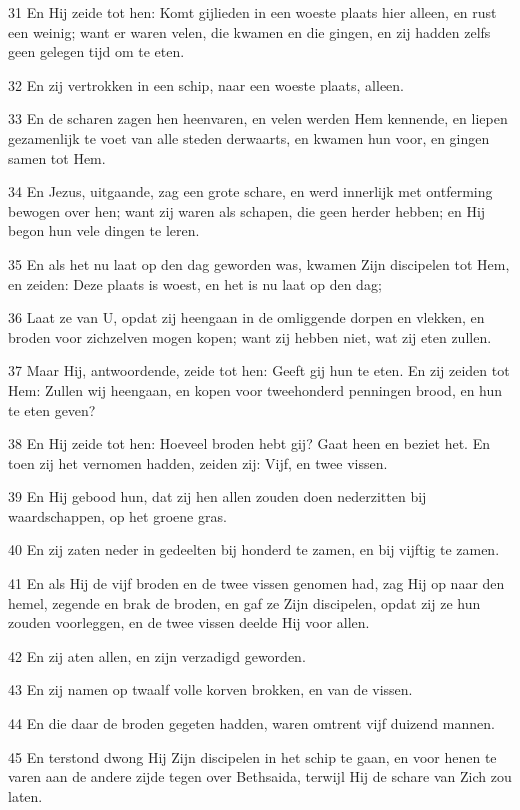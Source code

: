 \par 31 En Hij zeide tot hen: Komt gijlieden in een woeste plaats hier alleen, en rust een weinig; want er waren velen, die kwamen en die gingen, en zij hadden zelfs geen gelegen tijd om te eten.
\par 32 En zij vertrokken in een schip, naar een woeste plaats, alleen.
\par 33 En de scharen zagen hen heenvaren, en velen werden Hem kennende, en liepen gezamenlijk te voet van alle steden derwaarts, en kwamen hun voor, en gingen samen tot Hem.
\par 34 En Jezus, uitgaande, zag een grote schare, en werd innerlijk met ontferming bewogen over hen; want zij waren als schapen, die geen herder hebben; en Hij begon hun vele dingen te leren.
\par 35 En als het nu laat op den dag geworden was, kwamen Zijn discipelen tot Hem, en zeiden: Deze plaats is woest, en het is nu laat op den dag;
\par 36 Laat ze van U, opdat zij heengaan in de omliggende dorpen en vlekken, en broden voor zichzelven mogen kopen; want zij hebben niet, wat zij eten zullen.
\par 37 Maar Hij, antwoordende, zeide tot hen: Geeft gij hun te eten. En zij zeiden tot Hem: Zullen wij heengaan, en kopen voor tweehonderd penningen brood, en hun te eten geven?
\par 38 En Hij zeide tot hen: Hoeveel broden hebt gij? Gaat heen en beziet het. En toen zij het vernomen hadden, zeiden zij: Vijf, en twee vissen.
\par 39 En Hij gebood hun, dat zij hen allen zouden doen nederzitten bij waardschappen, op het groene gras.
\par 40 En zij zaten neder in gedeelten bij honderd te zamen, en bij vijftig te zamen.
\par 41 En als Hij de vijf broden en de twee vissen genomen had, zag Hij op naar den hemel, zegende en brak de broden, en gaf ze Zijn discipelen, opdat zij ze hun zouden voorleggen, en de twee vissen deelde Hij voor allen.
\par 42 En zij aten allen, en zijn verzadigd geworden.
\par 43 En zij namen op twaalf volle korven brokken, en van de vissen.
\par 44 En die daar de broden gegeten hadden, waren omtrent vijf duizend mannen.
\par 45 En terstond dwong Hij Zijn discipelen in het schip te gaan, en voor henen te varen aan de andere zijde tegen over Bethsaida, terwijl Hij de schare van Zich zou laten.
